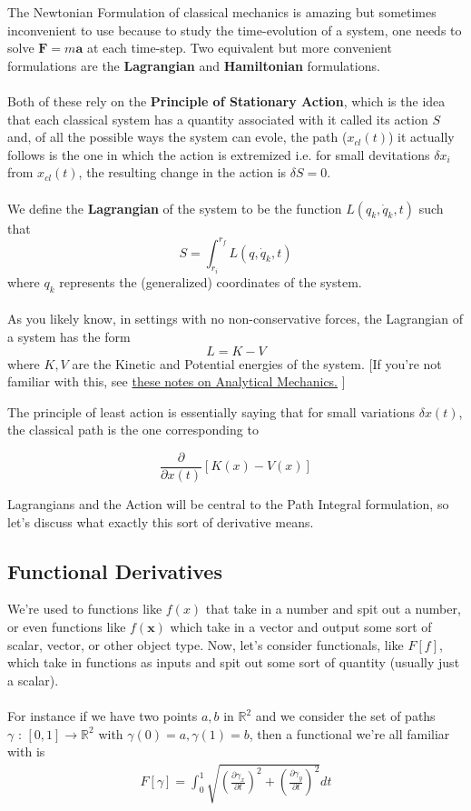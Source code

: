 \documentclass[11pt]{article}
\begin{document}
The Newtonian Formulation of classical mechanics is amazing but sometimes inconvenient to use because to study the time-evolution of a system, one needs to solve $\mathbf{F} = m\mathbf{a}$ at each time-step. Two equivalent but more convenient formulations are the \textbf{Lagrangian} and \textbf{Hamiltonian} formulations.
\\
\\
Both of these rely on the \textbf{Principle of Stationary Action}, which is the idea that each classical system has a quantity associated with it called its action $S$ and, of all the possible ways the system can evole, the path ($x_{cl}(t)$) it actually follows is the one in which the action is extremized i.e. for small devitations $\delta x_i$ from $x_{cl}(t)$, the resulting change in the action is $\delta S = 0$.
\\
\\
We define the \textbf{Lagrangian} of the system to be the function $L(q_k, \dot{q}_k, t)$ such that 
\[ S = \int_{r_i}^{r_f} L(q, \dot{q}_k, t) \]
where $q_k$ represents the (generalized) coordinates of the system.
\\
\\
As you likely know, in settings with no non-conservative forces, the Lagrangian of a system has the form 
\[ L = K - V \]
where $K, V$ are the Kinetic and Potential energies of the system. [If you're not familiar with this, see \href{https://github.com/kdeoskar/notes/blob/main/Physics%20105/Notes.pdf}{these notes on Analytical Mechanics.} ]

\vskip 0.5cm
The principle of least action is essentially saying that for small variations $\delta x(t)$, the classical path is the one corresponding to 

\[ \frac{\partial}{\partial x(t)} \left[ K(x) - V(x) \right] \]

Lagrangians and the Action will be central to the Path Integral formulation, so let's discuss what exactly this sort of derivative means.

\vskip 0.5cm
\subsection{Functional Derivatives}

We're used to functions like $f(x)$ that take in a number and spit out a number, or even functions like $f(\mathbf{x})$ which take in a vector and output some sort of scalar, vector, or other object type. Now, let's consider functionals, like $F[f]$, which take in functions as inputs and spit out some sort of quantity (usually just a scalar).
\\
\\
For instance if we have two points $a, b$ in $\mathbb{R}^2$ and we consider the set of paths $\gamma \text{ : } [0, 1] \rightarrow \mathbb{R}^2$ with $\gamma(0) = a, \gamma(1) = b$, then a functional we're all familiar with is 
\begin{align*}
    F[\gamma] = \int_{0}^{1} \sqrt{\left(\frac{\partial \gamma_x}{\partial t}\right)^2 + \left(\frac{\partial \gamma_y}{\partial t}\right)^2  } dt
\end{align*}
\end{document}
